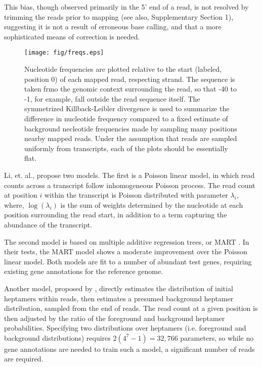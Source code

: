\documentclass{bioinfo}
\begin{document}
This bias, though observed primarily in the 5' end of a read, is not resolved by
trimming the reads prior to mapping \citep{Hansen2010} (see also, Supplementary
Section 1), suggesting it is not a result of erroneous base calling, and that a
more sophisticated means of correction is needed.

\begin{figure*}
\centerline{\texttt{[image: fig/freqs.eps]}}
\caption{Nucleotide frequencies are plotted relative to the start (labeled,
position 0) of each mapped read, respecting strand. The sequence is taken frmo
the genomic context surrounding the read, so that -40 to -1, for example, fall
outside the read sequence itself. The symmetrized Killback-Leibler divergence is
used to summarize the difference in nucleotide frequency compared to a fixed
estimate of background necleotide frequencies made by sampling many positions
nearby mapped reads.  Under the assumption that reads are sampled uniformly from
transcripts, each of the plots should be essentially flat.}
\label{fig:freqs}
\end{figure*}

Li, et. al., \cite{Li2010} propose two models. The first is a Poisson linear
model, in which read counts across a transcript follow inhomogeneous Poisson
process. The read count at position $i$ within the transcript is Poisson
distributed with parameter $\lambda_i$, where, $\log(\lambda_i)$ is the sum of
weights determined by the nucleotide at each position surrounding the read
start, in addition to a term capturing the abundance of the transcript.

The second model is based on multiple additive regression trees, or MART
\citep{Friedman2003}.  In their tests, the MART model shows a moderate
improvement over the Poisson linear model. Both models are fit to a number of
abundant test genes, requiring existing gene annotations for the reference
genome. 

Another model, proposed by \citet{Hansen2010}, directly estimates the
distribution of initial heptamers within reads, then estimates a presumed
background heptamer distribution, sampled from the end of reads. The read count
at a given position is then adjusted by the ratio of the foreground and
background heptamer probabilities. Specifying two distributions over heptamers
(i.e. foreground and background distributions) requires $2(4^7-1) = 32,766$
parameters, so while no gene annotations are needed to train such a model, a
significant number of reads are required.
\end{document}
